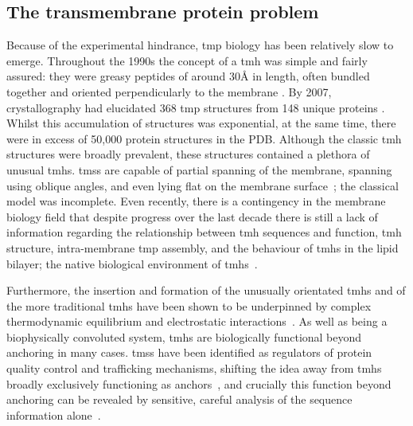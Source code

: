 \subsection{The transmembrane protein problem}
Because of the experimental hindrance, \gls{tmp} biology has been relatively slow to emerge.
Throughout the 1990s the concept of a \gls{tmh} was simple and fairly assured: they were greasy peptides of around 30{\AA} in length, often bundled together and oriented perpendicularly to the membrane \cite{VonHeijne2006}.
By 2007, crystallography had elucidated 368 \gls{tmp} structures from 148 unique proteins \cite{Carpenter2008}.
Whilst this accumulation of structures was exponential, at the same time, there were in excess of 50,000 protein structures in the PDB.
Although the classic \gls{tmh} structures were broadly prevalent, these structures contained a plethora of unusual \gls{tmh}s.
\gls{tms}s are capable of partial spanning of the membrane, spanning using oblique angles, and even lying flat on the membrane surface~\cite{VonHeijne2006, Elofsson2007}; the classical model was incomplete.
Even recently, there is a contingency in the  membrane biology field that despite progress over the last decade there is still a lack of information regarding the relationship between \gls{tmh} sequences and function, \gls{tmh} structure, intra-membrane \gls{tmp} assembly, and the behaviour of \gls{tmh}s in the lipid bilayer; the native biological environment of \gls{tmh}s~\cite{Ladokhin2015}.

Furthermore, the insertion and formation of the unusually orientated \gls{tmh}s and of the more traditional \gls{tmh}s have been shown to be underpinned by complex thermodynamic equilibrium and electrostatic interactions~\cite{Cymer2015, Elisa2012, Ismail2015}.
As well as being a biophysically convoluted system, \gls{tmh}s are biologically functional beyond anchoring in many cases.
\gls{tms}s have been identified as regulators of protein quality control and trafficking mechanisms, shifting the idea away from \gls{tmh}s broadly exclusively functioning as anchors~\cite{Hessa2011}, and crucially this function beyond anchoring can be revealed by sensitive, careful analysis of the sequence information alone~\cite{Wong2011, Wong2012}.

